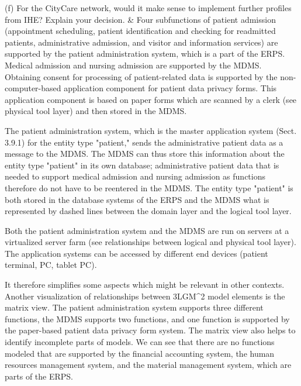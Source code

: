 (f) For the CityCare network, would it make sense to implement further profiles from IHE? Explain your decision. & Four subfunctions of patient admission (appointment scheduling, patient identification and checking for readmitted patients, administrative admission, and visitor and information services) are supported by the patient administration system, which is a part of the ERPS.
Medical admission and nursing admission are supported by the MDMS.
Obtaining consent for processing of patient-related data is supported by the non-computer-based application component for patient data privacy forms.
This application component is based on paper forms which are scanned by a clerk (see physical tool layer) and then stored in the MDMS.

The patient administration system, which is the master application system (Sect. 3.9.1) for the entity type "patient," sends the administrative patient data as a message to the MDMS.
The MDMS can thus store this information about the entity type "patient" in its own database; administrative patient data that is needed to support medical admission and nursing admission as functions therefore do not have to be reentered in the MDMS.
The entity type "patient" is both stored in the database systems of the ERPS and the MDMS what is represented by dashed lines between the domain layer and the logical tool layer.

Both the patient administration system and the MDMS are run on servers at a virtualized server farm (see relationships between logical and physical tool layer). The application systems can be accessed by different end devices (patient terminal, PC, tablet PC).

It therefore simplifies some aspects which might be relevant in other contexts.
Another visualization of relationships between 3LGM^2 model elements is the matrix view.
The patient administration system supports three different functions, the MDMS supports two functions, and one function is supported by the paper-based patient data privacy form system.
The matrix view also helps to identify incomplete parts of models.
We can see that there are no functions modeled that are supported by the financial accounting system, the human resources management system, and the material management system, which are parts of the ERPS.

